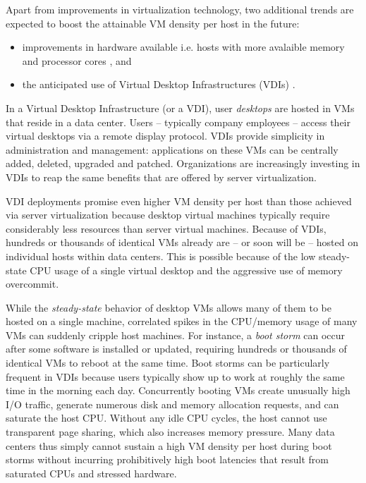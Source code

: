 Apart from improvements in virtualization technology, two additional trends 
are expected to boost the attainable VM density per host in the future:
\begin{itemize}
\item improvements in hardware available i.e. hosts with
more avalaible memory and processor cores \cite{hansen2010lithium},
and 
\item the anticipated use of Virtual Desktop Infrastructures (VDIs) \cite{vmwarevdi}.
\end{itemize}

In a Virtual Desktop Infrastructure (or a VDI), user {\em desktops} are hosted in
VMs that reside in a data center. 
Users -- typically company employees -- access their virtual desktops via a remote display protocol. 
VDIs provide simplicity in administration and management: applications on 
these VMs can be centrally added, deleted, upgraded and patched. 
Organizations are increasingly investing in VDIs to reap the same benefits
that are offered by server virtualization.

VDI deployments promise even higher VM density per
host than those achieved via server virtualization
because desktop virtual machines typically require
considerably less resources than server virtual machines.
Because of VDIs, hundreds or thousands of identical VMs already are -- or soon
will be -- hosted on individual hosts within data centers.
This is possible because of the low steady-state CPU
usage of a single virtual desktop and the aggressive
use of memory overcommit.

While the {\em steady-state} behavior of desktop VMs
allows many of them to be hosted on a single machine,
correlated spikes in the CPU/memory usage of many VMs can suddenly 
cripple host machines. For instance, a \emph{boot storm} \cite{hansen2010lithium, 
liao2011vmstore, meng2010tide, rajan2010vdc, vaghani2010virtual}
can occur after some software is installed or updated, requiring hundreds 
or thousands of identical VMs to reboot at the same time.
Boot storms can be particularly frequent in VDIs because users typically show up to
work at roughly the same time in the morning each day. 
Concurrently booting VMs create unusually high I/O traffic,
generate numerous disk and memory allocation requests,
and can saturate the host CPU. 
Without any idle CPU cycles, the host cannot use transparent page sharing,
which also increases memory pressure.
Many data centers thus simply cannot sustain a high VM density 
per host during boot storms without incurring
prohibitively high boot latencies that result
from saturated CPUs and stressed hardware.

